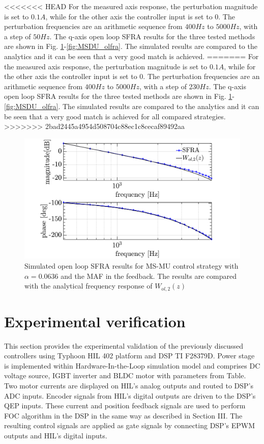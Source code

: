 \documentclass[journal]{IEEEtran}
\begin{document}
<<<<<<< HEAD
For the measured axis response, the perturbation magnitude is set to $0.1 A$, while for the other axis the controller input is set to 0. The perturbation frequencies are an arithmetic sequence from $400 Hz$ to $5000 Hz$, with a step of $50 Hz$. The q-axis open loop SFRA results for the three tested methods are shown in Fig. \ref{fig:MSMUmaf_olfra}-\ref{fig:MSDU_olfra}. The simulated results are compared to the analytics and it can be seen that a very good match is achieved.
=======
For the measured axis response, the perturbation magnitude is set to $0.1 A$, while for the other axis the controller input is set to 0. The perturbation frequencies are an arithmetic sequence from $400 Hz$ to $5000 Hz$, with a step of $230 Hz$. The q-axis open loop SFRA results for the three tested methods are shown in Fig. \ref{fig:MSMUmaf_olfra}-\ref{fig:MSDU_olfra}. The simulated results are compared to the analytics and it can be seen that a very good match is achieved for all compared strategies.
>>>>>>> 2bad2445a4954d508704c88ec1c8cecaf89492aa

\begin{figure}[t!]
    \centerline{\includegraphics[width=1\linewidth]{figures/ivan figs/MSMU_OL_SFRA.png}}
    \caption{Simulated open loop SFRA results for MS-MU control strategy with $\alpha = 0.0636$ and the MAF in the feedback. The results are compared with the analytical frequency response of $W_{ol,2}(z)$ }
    \label{fig:MSMUmaf_olfra} 
\end{figure}


\section{Experimental verification}

This section provides the experimental validation of the previously discussed controllers using Typhoon HIL 402 platform and DSP TI F28379D. Power stage is implemented within Hardware-In-the-Loop simulation model and comprises DC voltage source, IGBT inverter and BLDC motor with parameters from Table. Two motor currents are displayed on HIL’s analog outputs and routed to DSP's ADC inputs. Encoder signals from HIL’s digital outputs are driven to the DSP's QEP inputs. These current and position feedback signals are used to perform FOC algorithm in the DSP in the same way as described in Section III. The resulting control signals are applied as gate signals by connecting DSP’s EPWM outputs and HIL's digital inputs.
\end{document}
